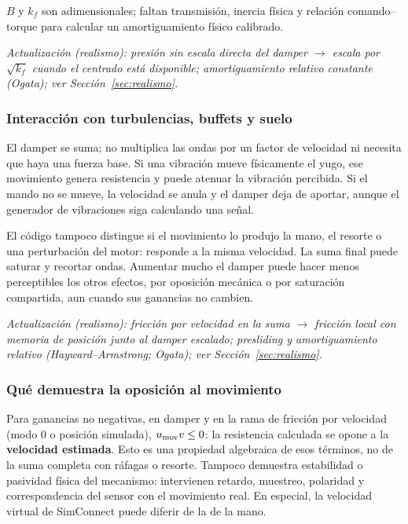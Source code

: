 \documentclass[11pt,a4paper]{article}
\begin{document}
$B$ y $k_f$ son adimensionales; faltan transmisión, inercia física y relación comando--torque para calcular un amortiguamiento físico calibrado.

\textit{Actualización (realismo): presión sin escala directa del damper $\rightarrow$ escala por $\sqrt{k_f}$ cuando el centrado está disponible; amortiguamiento relativo constante (Ogata); ver Sección~\ref{sec:realismo}.}

\subsubsection{Interacción con turbulencias, buffets y suelo}
El damper se suma; no multiplica las ondas por un factor de velocidad ni necesita que haya una fuerza base. Si una vibración mueve físicamente el yugo, ese movimiento genera resistencia y puede atenuar la vibración percibida. Si el mando no se mueve, la velocidad se anula y el damper deja de aportar, aunque el generador de vibraciones siga calculando una señal.

El código tampoco distingue si el movimiento lo produjo la mano, el resorte o una perturbación del motor: responde a la misma velocidad. La suma final puede saturar y recortar ondas. Aumentar mucho el damper puede hacer menos perceptibles los otros efectos, por oposición mecánica o por saturación compartida, aun cuando sus ganancias no cambien.


\textit{Actualización (realismo): fricción por velocidad en la suma $\rightarrow$ fricción local con memoria de posición junto al damper escalado; presliding y amortiguamiento relativo (Hayward--Armstrong; Ogata); ver Sección~\ref{sec:realismo}.}

\subsubsection{Qué demuestra la oposición al movimiento}
Para ganancias no negativas, en damper y en la rama de fricción por velocidad (modo 0 o posición simulada), $u_{\rm mov}v\le0$: la resistencia calculada se opone a la \textbf{velocidad estimada}. Esto es una propiedad algebraica de esos términos, no de la suma completa con ráfagas o resorte. Tampoco demuestra estabilidad o pasividad física del mecanismo: intervienen retardo, muestreo, polaridad y correspondencia del sensor con el movimiento real. En especial, la velocidad virtual de SimConnect puede diferir de la de la mano.
\end{document}
